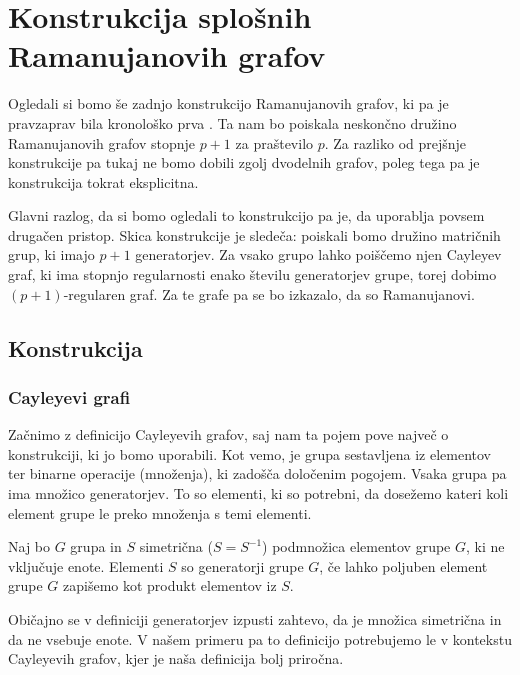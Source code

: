 \section{Konstrukcija splošnih Ramanujanovih grafov}
Ogledali si bomo še zadnjo konstrukcijo Ramanujanovih grafov, ki pa je pravzaprav bila kronološko prva \cite{lps-ramanujan}. Ta nam bo poiskala neskončno družino Ramanujanovih grafov stopnje \(p+1\) za praštevilo \(p\). Za razliko od prejšnje konstrukcije pa tukaj ne bomo dobili zgolj dvodelnih grafov, poleg tega pa je konstrukcija tokrat eksplicitna.

Glavni razlog, da si bomo ogledali to konstrukcijo pa je, da uporablja povsem drugačen pristop. Skica konstrukcije je sledeča: poiskali bomo družino matričnih grup, ki imajo \(p+1\) generatorjev. Za vsako grupo lahko poiščemo njen Cayleyev graf, ki ima stopnjo regularnosti enako številu generatorjev grupe, torej dobimo \((p+1)\)-regularen graf. Za te grafe pa se bo izkazalo, da so Ramanujanovi.

\subsection{Konstrukcija}
\subsubsection{Cayleyevi grafi}
Začnimo z definicijo Cayleyevih grafov, saj nam ta pojem pove največ o konstrukciji, ki jo bomo uporabili. Kot vemo, je grupa sestavljena iz elementov ter binarne operacije (množenja), ki zadošča določenim pogojem. Vsaka grupa pa ima množico generatorjev. To so elementi, ki so potrebni, da dosežemo kateri koli element grupe le preko množenja s temi elementi.

\begin{definicija}[Generatorji]
    Naj bo \(G\) grupa in \(S\) simetrična (\(S=S^{-1}\)) podmnožica elementov grupe \(G\), ki ne vključuje enote. Elementi \(S\) so generatorji grupe \(G\), če lahko poljuben element grupe \(G\) zapišemo kot produkt elementov iz \(S\).
\end{definicija}
Običajno se v definiciji generatorjev izpusti zahtevo, da je množica simetrična in da ne vsebuje enote. V našem primeru pa to definicijo potrebujemo le v kontekstu Cayleyevih grafov, kjer je naša definicija bolj priročna.

